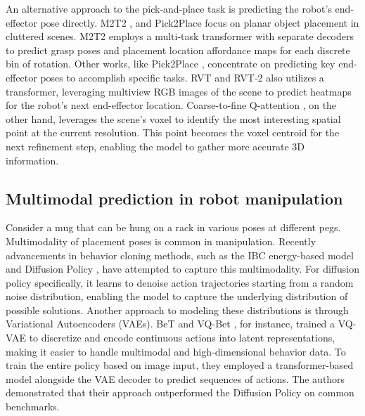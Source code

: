 An alternative approach to the pick-and-place task is predicting the robot's end-effector pose directly. M2T2 \cite{yuan2023m2t2}, and Pick2Place \cite{10160736} focus on planar object placement in cluttered scenes. M2T2 \cite{yuan2023m2t2} employs a multi-task transformer with separate decoders to predict grasp poses and placement location affordance maps for each discrete bin of rotation. Other works, like Pick2Place \cite{10160736}, concentrate on predicting key end-effector poses to accomplish specific tasks. RVT \cite{goyal2023rvt} and RVT-2 \cite{goyal2024rvt} also utilizes a transformer, leveraging multiview RGB images of the scene to predict heatmaps for the robot's next end-effector location. Coarse-to-fine Q-attention \cite{james2022coarsetofineqattentionefficientlearning}, on the other hand, leverages the scene's voxel to identify the most interesting spatial point at the current resolution. This point becomes the voxel centroid for the next refinement step, enabling the model to gather more accurate 3D information.

\subsection{Multimodal prediction in robot manipulation}
Consider a mug that can be hung on a rack in various poses at different pegs. Multimodality of placement poses is common in manipulation. Recently advancements in behavior cloning methods, such as the IBC energy-based model \cite{florence2021implicit} and Diffusion Policy \cite{chi2023diffusionpolicy}, have attempted to capture this multimodality. For diffusion policy specifically, it learns to denoise action trajectories starting from a random noise distribution, enabling the model to capture the underlying distribution of possible solutions. Another approach to modeling these distributions is through Variational Autoencoders (VAEs). BeT \cite{shafiullah2022behaviortransformerscloningk} and VQ-Bet \cite{lee2024behavior}, for instance, trained a VQ-VAE \cite{oord2018neuraldiscreterepresentationlearning} to discretize and encode continuous actions into latent representations, making it easier to handle multimodal and high-dimensional behavior data. To train the entire policy based on image input, they employed a transformer-based model alongside the VAE decoder to predict sequences of actions. The authors demonstrated that their approach outperformed the Diffusion Policy \cite{chi2023diffusionpolicy} on common benchmarks.
